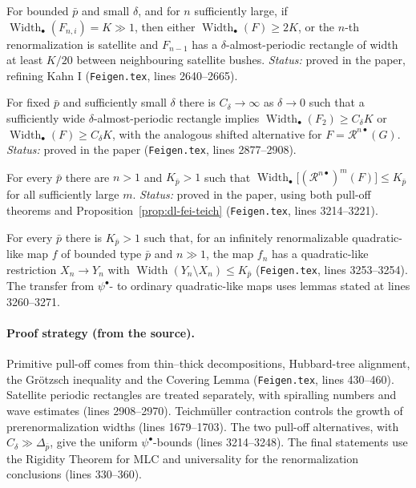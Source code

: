 \begin{theorem}
\label{thm:dl-fei-primitive}
For bounded $\bar p$ and small $\delta$, and for $n$ sufficiently large, if $\operatorname{Width}_\bullet(F_{n,i})=K\gg1$,
then either $\operatorname{Width}_\bullet(F)\ge 2K$, or the $n$-th renormalization is satellite and $F_{n-1}$ has a
$\delta$-almost-periodic rectangle of width at least $K/20$ between neighbouring satellite bushes.  \emph{Status:}
proved in the paper, refining Kahn I (\texttt{Feigen.tex}, lines 2640--2665).
\end{theorem}

\begin{theorem}
\label{thm:dl-fei-satellite}
For fixed $\bar p$ and sufficiently small $\delta$ there is $C_\delta\to\infty$ as $\delta\to0$ such that a sufficiently
wide $\delta$-almost-periodic rectangle implies $\operatorname{Width}_\bullet(F_2)\ge C_\delta K$ or
$\operatorname{Width}_\bullet(F)\ge C_\delta K$, with the analogous shifted alternative for $F=\mathcal R^{n\bullet}(G)$.
\emph{Status:} proved in the paper (\texttt{Feigen.tex}, lines 2877--2908).
\end{theorem}

\begin{theorem}
\label{thm:dl-fei-psi}
For every $\bar p$ there are $n>1$ and $K_{\bar p}>1$ such that
$\operatorname{Width}_\bullet\bigl[(\mathcal R^{n\bullet})^m(F)\bigr]\le K_{\bar p}$ for all sufficiently large $m$.
\emph{Status:} proved in the paper, using both pull-off theorems and Proposition~\ref{prop:dl-fei-teich}
(\texttt{Feigen.tex}, lines 3214--3221).
\end{theorem}

\begin{theorem}
\label{thm:dl-fei-ql}
For every $\bar p$ there is $K_{\bar p}>1$ such that, for an infinitely renormalizable quadratic-like map $f$ of bounded
type $\bar p$ and $n\gg1$, the map $f_n$ has a quadratic-like restriction $X_n\to Y_n$ with
$\operatorname{Width}(Y_n\setminus X_n)\le K_{\bar p}$ (\texttt{Feigen.tex}, lines 3253--3254).  The transfer from
$\psi^\bullet$- to ordinary quadratic-like maps uses lemmas stated at lines 3260--3271.
\end{theorem}

\paragraph{Proof strategy (from the source).}
Primitive pull-off comes from thin--thick decompositions, Hubbard-tree alignment, the Grötzsch inequality and the
Covering Lemma (\texttt{Feigen.tex}, lines 430--460).  Satellite periodic rectangles are treated separately, with
spiralling numbers and wave estimates (lines 2908--2970).  Teichm\"uller contraction controls the growth of
prerenormalization widths (lines 1679--1703).  The two pull-off alternatives, with $C_\delta\gg\Delta_{\bar p}$, give
the uniform $\psi^\bullet$-bounds (lines 3214--3248).  The final statements use the Rigidity Theorem for MLC and
universality for the renormalization conclusions (lines 330--360).

